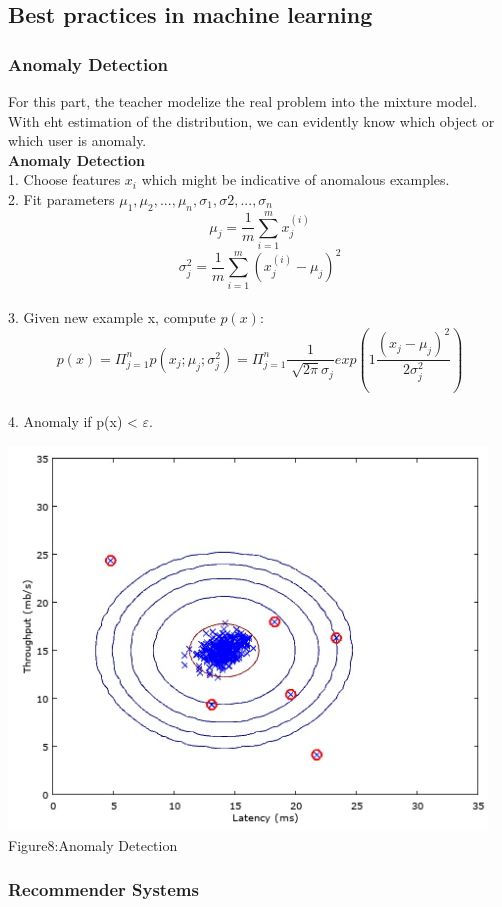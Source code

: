 \documentclass[a4paper]{article}
\begin{document}
{\subsection{Best practices in machine learning}
\subsubsection{\textbf{Anomaly Detection}}
For this part, the teacher modelize the real problem into the mixture model. With eht estimation of the distribution, we can evidently know which object or which user is anomaly.\\
\textbf{Anomaly Detection}\\
1. Choose features $x_i$ which might be indicative of anomalous examples.\\
2. Fit parameters $\mu_1,\mu_2,...,\mu_n,\sigma_1,\sigma2,...,\sigma_n$\\
$$\mu_j=\frac{1}{m}\sum_{i=1}^{m}x_j^{(i)}$$
$$\sigma_j^2=\frac{1}{m}\sum_{i=1}^{m}(x_j^{(i)}-\mu_j)^2$$\\
3. Given new example x, compute $p(x)$:
$$p(x)=\Pi_{j=1}^np(x_j;\mu_j;\sigma_j^2)=\Pi_{j=1}^n\frac{1}{\sqrt[]{2\pi}\sigma_j}exp(1\frac{(x_j-\mu_j)^2}{2\sigma_j^2})$$\\
4. Anomaly if p(x) < $\varepsilon$.
 \begin{center}
 \includegraphics[width=5in]{dt.png}
Figure8:Anomaly Detection
\end{center}
\subsubsection{\textbf{Recommender Systems}}

}
\end{document}
